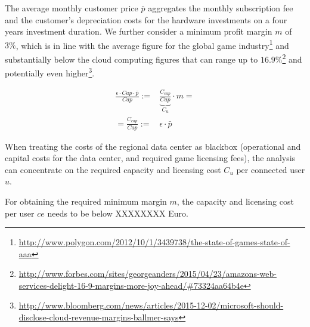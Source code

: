 The average monthly customer price $\bar{p}$ aggregates the monthly subscription fee and the customer's depreciation costs for the hardware investments on a four years investment duration. We further consider a minimum profit margin $m$ of $3 \%$, which is in line with the average figure for the global game industry\footnote{\url{http://www.polygon.com/2012/10/1/3439738/the-state-of-games-state-of-aaa}} and substantially below the cloud computing figures that can range up to $16.9\%$\footnote{\url{http://www.forbes.com/sites/georgeanders/2015/04/23/amazons-web-services-delight-16-9-margins-more-joy-ahead/\#73324aa64b4e}} and potentially even higher\footnote{\url{http://www.bloomberg.com/news/articles/2015-12-02/microsoft-should-disclose-cloud-revenue-margins-ballmer-says}}.


\begin{align} \label{eq:computational_efficiency}
	\frac{\epsilon \cdot Cap \cdot \bar{p}}{Cap} :=& \underbrace{\frac{C_{cap}}{Cap}}_{C_{u}} \cdot m =\\
	=\frac{C_{cap}}{Cap} :=& \epsilon \cdot \bar{p}
\end{align}

When treating the costs of the regional data center as blackbox (operational and capital costs for the data center, and required game licensing fees), the analysis can concentrate on the required capacity and licensing cost $C_{u}$ per connected user $u$.


For obtaining the required minimum margin $m$, the capacity and licensing cost per user $ce$ needs to be below XXXXXXXX Euro.

